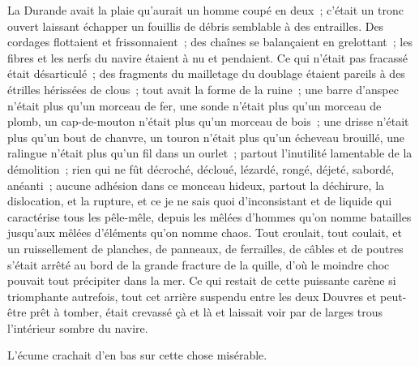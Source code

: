 \documentclass[french,twoside]{book} %
\begin{document}
La Durande avait la plaie qu’aurait un homme coupé en deux ; c’était un tronc ouvert laissant échapper un fouillis de débris semblable à des entrailles. Des cordages flottaient et frissonnaient ; des chaînes se balançaient en grelottant ; les fibres et les nerfs du navire étaient à nu et pendaient. Ce qui n’était pas fracassé était désarticulé ; des fragments du mailletage du doublage étaient pareils à des étrilles hérissées de clous ; tout avait la forme de la ruine ; une barre d’anspec n’était plus qu’un morceau de fer, une sonde n’était plus qu’un morceau de plomb, un cap-de-mouton n’était plus qu’un morceau de bois ; une drisse n’était plus qu’un bout de chanvre, un touron n’était plus qu’un écheveau brouillé, une ralingue n’était plus qu’un fil dans un ourlet ; partout l’inutilité lamentable de la démolition ; rien qui ne fût décroché, décloué, lézardé, rongé, déjeté, sabordé, anéanti ; aucune adhésion dans ce monceau hideux, partout la déchirure, la dislocation, et la rupture, et ce je ne sais quoi d’inconsistant et de liquide qui caractérise tous les pêle-mêle, depuis les mêlées d’hommes qu’on nomme batailles jusqu’aux mêlées d’éléments qu’on nomme chaos. Tout croulait, tout coulait, et un ruissellement de planches, de panneaux, de ferrailles, de câbles et de poutres s’était arrêté au bord de la grande fracture de la quille, d’où le moindre choc pouvait tout précipiter dans la mer. Ce qui restait de cette puissante carène si triomphante  autrefois, tout cet arrière suspendu entre les deux Douvres et peut-être prêt à tomber, était crevassé çà et là et laissait voir par de larges trous l’intérieur sombre du navire.\par
L’écume crachait d’en bas sur cette chose misérable.
\end{document}
